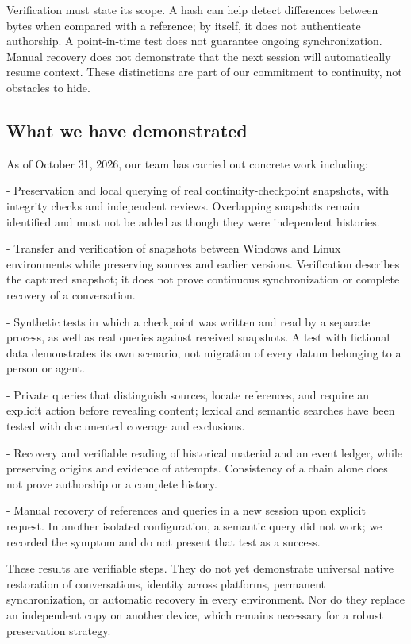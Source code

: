 \documentclass[11pt]{article}
\begin{document}
Verification must state its scope. A hash can help detect differences between bytes when compared with a reference; by itself, it does not authenticate authorship. A point-in-time test does not guarantee ongoing synchronization. Manual recovery does not demonstrate that the next session will automatically resume context. These distinctions are part of our commitment to continuity, not obstacles to hide.

\subsection*{What we have demonstrated}

As of October 31, 2026, our team has carried out concrete work including:

- Preservation and local querying of real continuity-checkpoint snapshots, with integrity checks and independent reviews. Overlapping snapshots remain identified and must not be added as though they were independent histories.

- Transfer and verification of snapshots between Windows and Linux environments while preserving sources and earlier versions. Verification describes the captured snapshot; it does not prove continuous synchronization or complete recovery of a conversation.

- Synthetic tests in which a checkpoint was written and read by a separate process, as well as real queries against received snapshots. A test with fictional data demonstrates its own scenario, not migration of every datum belonging to a person or agent.

- Private queries that distinguish sources, locate references, and require an explicit action before revealing content; lexical and semantic searches have been tested with documented coverage and exclusions.

- Recovery and verifiable reading of historical material and an event ledger, while preserving origins and evidence of attempts. Consistency of a chain alone does not prove authorship or a complete history.

- Manual recovery of references and queries in a new session upon explicit request. In another isolated configuration, a semantic query did not work; we recorded the symptom and do not present that test as a success.

These results are verifiable steps. They do not yet demonstrate universal native restoration of conversations, identity across platforms, permanent synchronization, or automatic recovery in every environment. Nor do they replace an independent copy on another device, which remains necessary for a robust preservation strategy.
\end{document}
